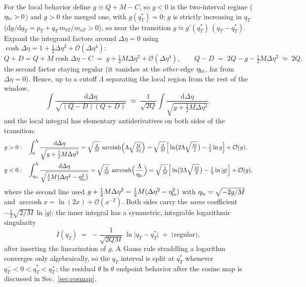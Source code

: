 \documentclass[11pt]{article}
\begin{document}
For the local behavior define $g\equiv Q+M-C$, so $g<0$ is the
two-interval regime ($\eta_{\rm lo}>0$) and $g>0$ the merged one, with
$g(q_T^{*})=0$; $g$ is strictly increasing in $q_T$
($\mathrm{d}g/\mathrm{d}q_T = p_T + q_T\,m_{bT}/m_{aT}>0$), so near the
transition $g\simeq g'(q_T^{*})\,(q_T-q_T^{*})$.  Expand the integrand
factors around $\Delta\eta=0$ using
$\cosh\Delta\eta=1+\tfrac12\Delta\eta^{2}+\mathcal O(\Delta\eta^{4})$:
\begin{equation}
Q+D=Q+M\cosh\Delta\eta-C
 \;=\; g+\tfrac12 M\Delta\eta^{2}+\mathcal O(\Delta\eta^{4}),
\qquad
Q-D\;=\;2Q-g-\tfrac12M\Delta\eta^{2}\;\simeq\;2Q ,
\end{equation}
the second factor staying regular (it vanishes at the \emph{other} edge
$\eta_{\rm hi}$, far from $\Delta\eta=0$).  Hence, up to a cutoff
$\Lambda$ separating the local region from the rest of the window,
\begin{equation}
\int\frac{\mathrm{d}\Delta\eta}{\sqrt{(Q-D)(Q+D)}}
\;\simeq\;
\frac{1}{\sqrt{2Q}}\int\frac{\mathrm{d}\Delta\eta}
{\sqrt{g+\tfrac12M\Delta\eta^{2}}} ,
\end{equation}
and the local integral has elementary antiderivatives on both sides of
the transition:
\begin{align}
g>0:&\quad
\int_{0}^{\Lambda}\frac{\mathrm{d}\Delta\eta}
{\sqrt{g+\tfrac12M\Delta\eta^{2}}}
=\sqrt{\tfrac{2}{M}}\,
\operatorname{arcsinh}\!\Big(\Lambda\sqrt{\tfrac{M}{2g}}\Big)
=\sqrt{\tfrac{2}{M}}\Big[\ln\!\big(2\Lambda\sqrt{\tfrac{M}{2}}\big)
-\tfrac12\ln g\Big]+\mathcal O(g),\\
g<0:&\quad
\int_{\eta_{\rm lo}}^{\Lambda}\frac{\mathrm{d}\Delta\eta}
{\sqrt{\tfrac12M\big(\Delta\eta^{2}-\eta_{\rm lo}^{2}\big)}}
=\sqrt{\tfrac{2}{M}}\,
\operatorname{arccosh}\!\Big(\frac{\Lambda}{\eta_{\rm lo}}\Big)
=\sqrt{\tfrac{2}{M}}\Big[\ln\!\big(2\Lambda\sqrt{\tfrac{M}{2}}\big)
-\tfrac12\ln|g|\Big]+\mathcal O(g),
\end{align}
where the second line used $g+\tfrac12M\Delta\eta^{2}
=\tfrac12M(\Delta\eta^{2}-\eta_{\rm lo}^{2})$ with
$\eta_{\rm lo}=\sqrt{-2g/M}$ and
$\operatorname{arccosh}x=\ln(2x)+\mathcal O(x^{-2})$.  Both sides carry
the \emph{same} coefficient $-\tfrac12\sqrt{2/M}\,\ln|g|$: the inner
integral has a symmetric, integrable logarithmic singularity
\begin{equation}
I(q_T)\;=\;-\frac{1}{\sqrt{2QM}}\,\ln\big|q_T-q_T^{*}\big|
\;+\;\text{(regular)} ,
\label{eq:logsing-form}
\end{equation}
after inserting the linearization of $g$.  A Gauss rule straddling a
logarithm converges only algebraically, so the $q_T$ interval is split at
$q_T^{*}$ whenever $q_T^-<0<q_T^{*}<q_T^+$; the residual
$\theta\ln\theta$ endpoint behavior after the cosine map is discussed in
Sec.~\ref{sec:cosmap}.
\end{document}
